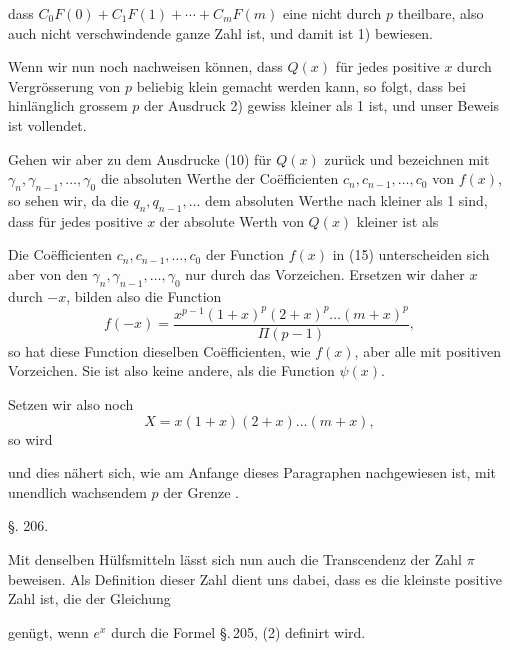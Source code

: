 dass $C_0 F(0) + C_1 F(1) + \cdots + C_m F(m)$ eine nicht durch $p$ theilbare, also auch nicht verschwindende ganze Zahl ist, und damit ist 1) bewiesen.

Wenn wir nun noch nachweisen können, dass $Q(x)$ für jedes positive $x$ durch Vergrösserung von $p$ beliebig klein gemacht werden kann, so folgt, dass bei hinlänglich grossem $p$ der Ausdruck 2) gewiss kleiner als 1 ist, und unser Beweis ist vollendet.

Gehen wir aber zu dem Ausdrucke (10) für $Q(x)$ zurück und bezeichnen mit $\gamma_n, \gamma_{n-1}, \ldots, \gamma_0$ die absoluten Werthe der Coëfficienten $c_n, c_{n-1}, \ldots, c_0$ von $f(x)$, so sehen wir, da die $q_n, q_{n-1}, \ldots$ dem absoluten Werthe nach kleiner als 1 sind, dass für jedes positive $x$ der absolute Werth von $Q(x)$ kleiner ist als


Die Coëfficienten $c_n, c_{n-1}, \ldots, c_0$ der Function $f(x)$ in (15) unterscheiden sich aber von den $\gamma_n, \gamma_{n-1}, \ldots, \gamma_0$ nur durch das Vorzeichen. Ersetzen wir daher $x$ durch $-x$, bilden also die Function
\[
f(-x) = \frac{x^{p-1}(1+x)^p(2+x)^p\ldots(m+x)^p}{\Pi(p-1)},
\]
so hat diese Function dieselben Coëfficienten, wie $f(x)$, aber alle mit positiven Vorzeichen. Sie ist also keine andere, als die Function $\psi(x)$.

Setzen wir also noch
\[
X = x(1+x)(2+x)\ldots(m+x),
\]
so wird


und dies nähert sich, wie am Anfange dieses Paragraphen nachgewiesen ist, mit unendlich wachsendem $p$ der Grenze .


\begin{center}
§. 206.

\end{center}

Mit denselben Hülfsmitteln lässt sich nun auch die Transcendenz der Zahl $\pi$ beweisen. Als Definition dieser Zahl dient uns dabei, dass es die kleinste positive Zahl ist, die der Gleichung


genügt, wenn $e^x$ durch die Formel \S.\,205, (2) definirt wird.
